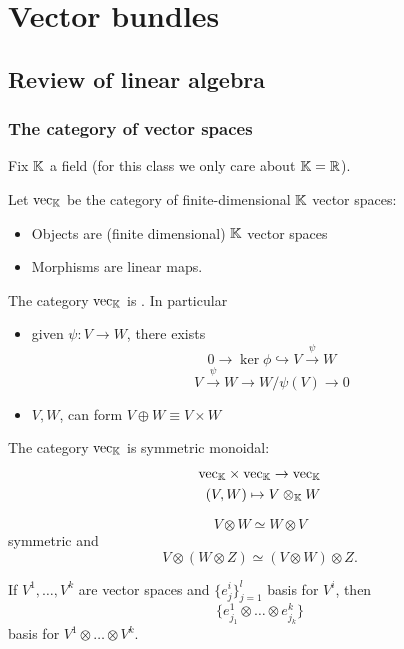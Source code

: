 \chapter{Vector bundles}

\section{Review of linear algebra}

\subsection{The category of vector spaces}

Fix \(\mathbb{K}\) a field (for this class we only care about \(\mathbb{K}=\mathbb{R}\)).

Let \(\text{vec}_{\mathbb{K}}\) be the category of finite-dimensional \(\mathbb{K}\) vector spaces:
\begin{itemize}
    \item Objects are (finite dimensional) \(\mathbb{K}\) vector spaces 
    \item Morphisms are linear maps.
\end{itemize}

The category \(\text{vec}_{\mathbb{K}}\) is . In particular 
\begin{itemize}
    \item given \(\psi:V\to W\), there exists \[0\to \ker \phi \hookrightarrow V\stackrel{\psi}{\to} W\]
        \[V\stackrel{\psi}{\to} W\to W/\psi(V)\to 0\]
    \item \(V,W\), can form \(V\oplus W \equiv V\times W\) 
\end{itemize}

The category \(\text{vec}_{\mathbb{K}}\) is symmetric monoidal:
\begin{align*}
    \text{vec}_{\mathbb{K}} \times \text{vec}_{\mathbb{K}} \to \text{vec}_{\mathbb{K}}\\
    (V,W)\mapsto V \otimes_{\mathbb{K}} W
\end{align*}

 \[V\otimes W \simeq W\otimes V\] symmetric and 
\[V\otimes(W\otimes Z)\simeq (V\otimes W)\otimes Z.\]

 If \(V^1,\dots, V^k\) are vector spaces and \(\{e_j^i\}_{j=1}^l\) basis for \(V^i\), 
then \[\{e_{j_1}^1\otimes\dots\otimes e_{j_k}^k\}\]
basis for \(V^1\otimes \dots\otimes V^k\).

